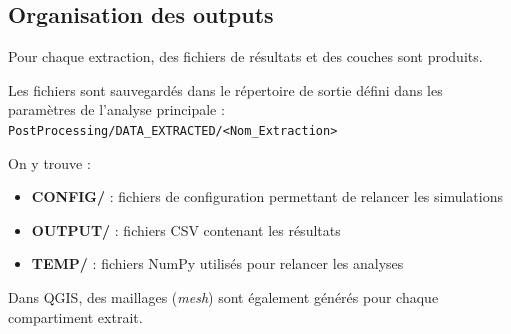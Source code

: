 \subsection*{Organisation des outputs}

Pour chaque extraction, des fichiers de résultats et des couches sont produits.

Les fichiers sont sauvegardés dans le répertoire de sortie défini dans les paramètres de l’analyse principale :
\texttt{PostProcessing/DATA\_EXTRACTED/<Nom\_Extraction>}

On y trouve :
\begin{itemize}
    \item \textbf{CONFIG/} : fichiers de configuration permettant de relancer les simulations
    \item \textbf{OUTPUT/} : fichiers CSV contenant les résultats
    \item \textbf{TEMP/} : fichiers NumPy utilisés pour relancer les analyses
\end{itemize}

Dans QGIS, des maillages (\textit{mesh}) sont également générés pour chaque compartiment extrait.